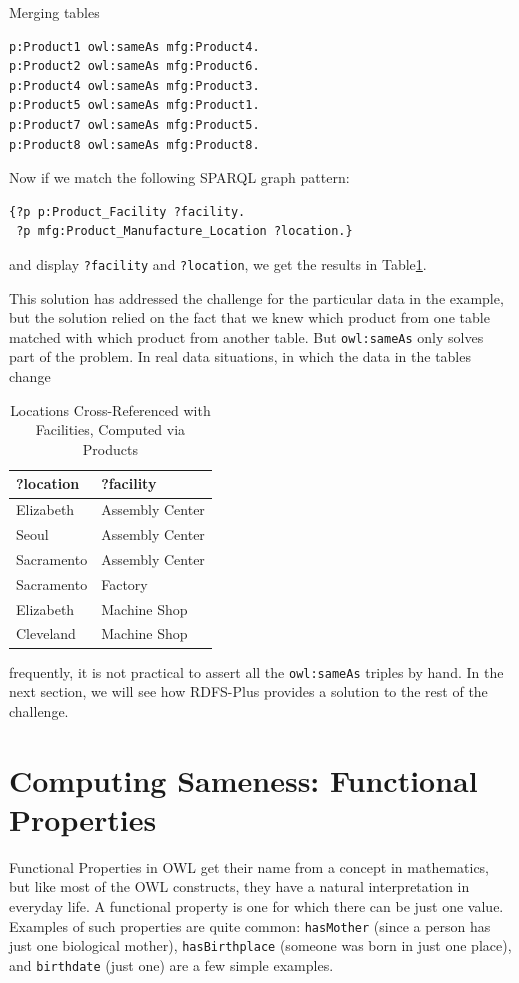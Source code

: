 \begin{challenge}{Merging tables}
\begin{lstlisting}
p:Product1 owl:sameAs mfg:Product4.
p:Product2 owl:sameAs mfg:Product6.
p:Product4 owl:sameAs mfg:Product3.
p:Product5 owl:sameAs mfg:Product1.
p:Product7 owl:sameAs mfg:Product5.
p:Product8 owl:sameAs mfg:Product8.
\end{lstlisting}

Now if we match the following SPARQL graph pattern:

\begin{lstlisting}
{?p p:Product_Facility ?facility.
 ?p mfg:Product_Manufacture_Location ?location.}
\end{lstlisting}

and display \texttt{?facility} and \texttt{?location}, we get the results in Table\ref{tab:ch9.3}.
\end{challenge}

This solution has addressed the challenge for the particular data in the
example, but the solution relied on the fact that we knew which product
from one table matched with which product from another table. But
\texttt{owl:sameAs} only solves part of the problem. In real data situations, in
which the data in the tables change

\begin{table}
\label{tab:ch9.3}
\caption{Locations Cross-Referenced with Facilities, Computed via
Products}
\begin{tabular}{|ll|}
\hline
?location&?facility\\
\hline
Elizabeth&Assembly Center\\
Seoul&Assembly Center\\
Sacramento&Assembly Center\\
Sacramento&Factory\\
Elizabeth&Machine Shop\\
Cleveland&Machine Shop \\
\hline
\end{tabular}
\end{table}

frequently, it is not practical to assert all the \texttt{owl:sameAs} triples by
hand. In the next section, we will see how
RDFS-Plus provides a solution to the rest of the challenge.

\section{Computing Sameness: Functional Properties}

Functional Properties in OWL get their name from a concept in
mathematics, but like most of the OWL constructs, they have a natural
interpretation in everyday life. A functional property is one for which
there can be just one value. Examples of such properties are quite
common: \texttt{hasMother} (since a person has just one biological mother),
\texttt{hasBirthplace} (someone was born in just one place), and \texttt{birthdate} (just
one) are a few simple examples.

